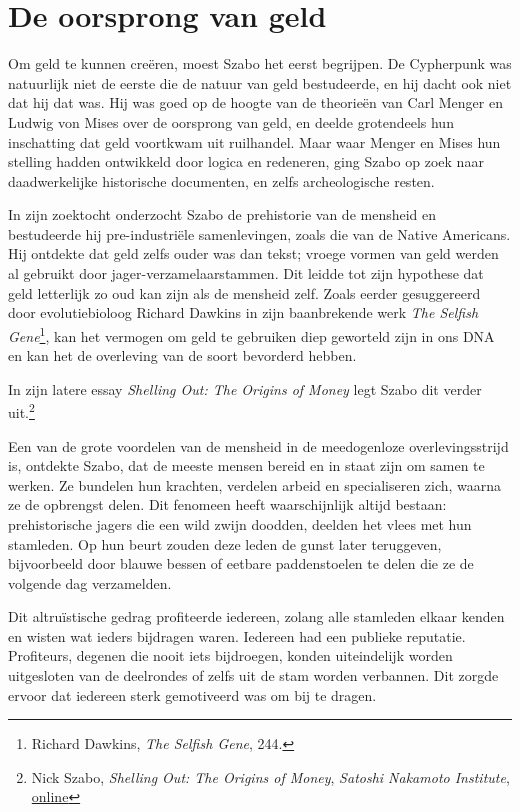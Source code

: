 \documentclass[
  a5paper,
  smalldemyvopaper,11pt,twoside,onecolumn,openright,extrafontsizes,
hidelinks]{memoir}
\begin{document}
\section{De oorsprong van geld}\label{de-oorsprong-van-geld}

Om geld te kunnen creëren, moest Szabo het eerst begrijpen. De
Cypherpunk was natuurlijk niet de eerste die de natuur van geld
bestudeerde, en hij dacht ook niet dat hij dat was. Hij was goed op de
hoogte van de theorieën van Carl Menger en Ludwig von Mises over de
oorsprong van geld, en deelde grotendeels hun inschatting dat geld
voortkwam uit ruilhandel. Maar waar Menger en Mises hun stelling hadden
ontwikkeld door logica en redeneren, ging Szabo op zoek naar
daadwerkelijke historische documenten, en zelfs archeologische resten.

In zijn zoektocht onderzocht Szabo de prehistorie van de mensheid en
bestudeerde hij pre-industriële samenlevingen, zoals die van de Native
Americans. Hij ontdekte dat geld zelfs ouder was dan tekst; vroege
vormen van geld werden al gebruikt door jager-verzamelaarstammen. Dit
leidde tot zijn hypothese dat geld letterlijk zo oud kan zijn als de
mensheid zelf. Zoals eerder gesuggereerd door evolutiebioloog Richard
Dawkins in zijn baanbrekende werk \emph{The Selfish Gene}\footnote{Richard
  Dawkins, \emph{The Selfish Gene}, 244.}, kan het vermogen om geld te
gebruiken diep geworteld zijn in ons DNA en kan het de overleving van de
soort bevorderd hebben.

In zijn latere essay \emph{Shelling Out: The Origins of Money} legt
Szabo dit verder uit.\footnote{Nick Szabo, \emph{Shelling Out: The
  Origins of Money}, \emph{Satoshi Nakamoto Institute},
  \href{https://nakamotoinstitute.org/library/shelling-out/}{online}}

Een van de grote voordelen van de mensheid in de meedogenloze
overlevingsstrijd is, ontdekte Szabo, dat de meeste mensen bereid en in
staat zijn om samen te werken. Ze bundelen hun krachten, verdelen arbeid
en specialiseren zich, waarna ze de opbrengst delen. Dit fenomeen heeft
waarschijnlijk altijd bestaan: prehistorische jagers die een wild zwijn
doodden, deelden het vlees met hun stamleden. Op hun beurt zouden deze
leden de gunst later teruggeven, bijvoorbeeld door blauwe bessen of
eetbare paddenstoelen te delen die ze de volgende dag verzamelden.

Dit altruïstische gedrag profiteerde iedereen, zolang alle stamleden
elkaar kenden en wisten wat ieders bijdragen waren. Iedereen had een
publieke reputatie. Profiteurs, degenen die nooit iets bijdroegen,
konden uiteindelijk worden uitgesloten van de deelrondes of zelfs uit de
stam worden verbannen. Dit zorgde ervoor dat iedereen sterk gemotiveerd
was om bij te dragen.
\end{document}

